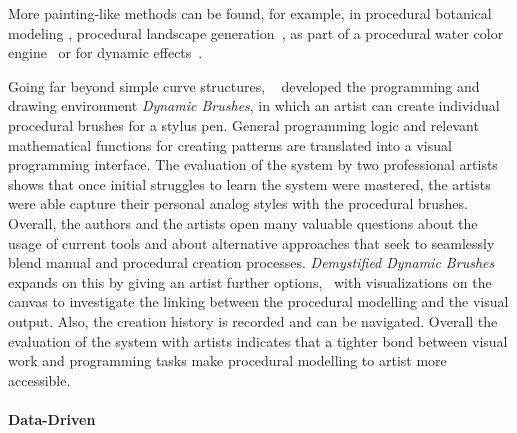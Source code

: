 More painting-like methods can be found, for example, in procedural botanical modeling \cite{anastacio_2008_spl,chen_2008_stm,palubicki_2009_sot}, procedural landscape generation~\cite{emilien_2015_wie}, as part of a procedural water color engine~\cite{diverdi_2013_ppp} or for dynamic effects~\cite{xing_2016_eit}. 

Going far beyond simple curve structures, \citeauthor*{jacobs_2018_dbe}~\cite{jacobs_2018_dbe} developed the programming and drawing environment \textit{Dynamic Brushes}, in which an artist can create individual procedural brushes for a stylus pen. General programming logic and relevant mathematical functions for creating patterns are translated into a visual programming interface. The evaluation of the system by two professional artists shows that once initial struggles to learn the system were mastered, the artists were able capture their personal analog styles with the procedural brushes. Overall, the authors and the artists open many valuable questions about the usage of current tools and about alternative approaches that seek to seamlessly blend manual and procedural creation processes. \textit{Demystified Dynamic Brushes}~\cite{li_2020_sva} expands on this by giving an artist further options, \eg~with visualizations on the canvas to investigate the linking between the procedural modelling and the visual output. Also, the creation history is recorded and can be navigated. Overall the evaluation of the system with artists indicates that a tighter bond between visual work and programming tasks make procedural modelling to artist more accessible.

\paragraph*{Data-Driven}
\label{para:analysis_curves_datadriven}



